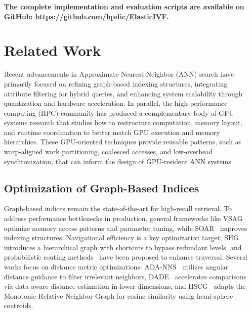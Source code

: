 \documentclass[sigconf,nonacm]{acmart}
\theoremstyle{plain}
\theoremstyle{definition}
\theoremstyle{remark}
\begin{document}
\noindent
\textbf{The complete implementation and evaluation scripts are available on GitHub: \url{https://github.com/hpdic/ElasticIVF}.}


\section{Related Work}
\label{sec:related_work}

Recent advancements in Approximate Nearest Neighbor (ANN) search have primarily focused on refining graph-based indexing structures, integrating attribute filtering for hybrid queries, and enhancing system scalability through quantization and hardware acceleration. In parallel, the high-performance computing (HPC) community has produced a complementary body of GPU systems research that studies how to restructure computation, memory layout, and runtime coordination to better match GPU execution and memory hierarchies. These GPU-oriented techniques provide reusable patterns, such as warp-aligned work partitioning, coalesced accesses, and low-overhead synchronization, that can inform the design of GPU-resident ANN systems.

\subsection{Optimization of Graph-Based Indices}

Graph-based indices remain the state-of-the-art for high-recall retrieval. To address performance bottlenecks in production, general frameworks like VSAG~\cite{10.14778/3750601.3750624} optimize memory access patterns and parameter tuning, while SOAR~\cite{DBLP:conf/nips/SunSDGK23} improves indexing structures. 
Navigational efficiency is a key optimization target; SHG~\cite{10.14778/3748191.3748212} introduces a hierarchical graph with shortcuts to bypass redundant levels, and probabilistic routing methods~\cite{lu2024probabilistic} have been proposed to enhance traversal. 
Several works focus on distance metric optimizations: ADA-NNS~\cite{10.1145/3696410.3714870} utilizes angular distance guidance to filter irrelevant neighbors, DADE~\cite{10.14778/3712221.3712244} accelerates comparisons via data-aware distance estimation in lower dimensions, and HSCG~\cite{10.1145/3769786} adapts the Monotonic Relative Neighbor Graph for cosine similarity using hemi-sphere centroids.
\end{document}
